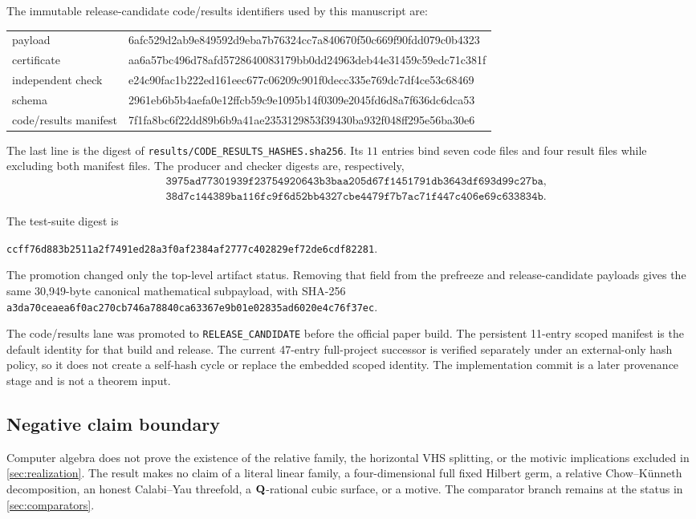 The immutable release-candidate code/results identifiers used by this
manuscript are:
\begin{center}
\scriptsize\ttfamily
\begin{tabular}{@{}ll@{}}
payload & 6afc529d2ab9e849592d9eba7b76324cc7a840670f50c669f90fdd079c0b4323\\
certificate & aa6a57bc496d78afd5728640083179bb0dd24963deb44e31459c59edc71c381f\\
independent check & e24c90fac1b222ed161eec677c06209c901f0decc335e769dc7df4ce53c68469\\
schema & 2961eb6b5b4aefa0e12ffcb59c9e1095b14f0309e2045fd6d8a7f636dc6dca53\\
code/results manifest & 7f1fa8bc6f22dd89b6b9a41ae2353129853f39430ba932f048ff295e56ba30e6\\
\end{tabular}
\end{center}
The last line is the digest of
\texttt{results/CODE\_RESULTS\_HASHES.sha256}.  Its \(11\) entries bind
seven code files and four result files while excluding both manifest files.
The producer and checker digests are, respectively,
\[
\begin{aligned}
&\texttt{3975ad77301939f23754920643b3baa205d67f1451791db3643df693d99c27ba},\\
&\texttt{38d7c144389ba116fc9f6d52bb4327cbe4479f7b7ac71f447c406e69c633834b}.
\end{aligned}
\]

The test-suite digest is
\begin{center}
  \scriptsize
  \texttt{ccff76d883b2511a2f7491ed28a3f0af2384af2777c402829ef72de6cdf82281}.
\end{center}
The promotion changed only the top-level artifact status.  Removing that
field from the prefreeze and release-candidate payloads gives the same
30,949-byte canonical mathematical subpayload, with SHA-256
\texttt{a3da70ceaea6f0ac270cb746a78840ca63367e9b01e02835ad6020e4c76f37ec}.

The code/results lane was promoted to \texttt{RELEASE\_CANDIDATE} before the
official paper build.  The persistent 11-entry scoped manifest is the default
identity for that build and release.  The current 47-entry full-project
successor is verified separately under an external-only hash policy, so it
does not create a self-hash cycle or replace the embedded scoped identity.
The implementation commit is a later provenance stage and is not a theorem
input.

\subsection{Negative claim boundary}

Computer algebra does not prove the existence of the relative family, the
horizontal VHS splitting, or the motivic implications excluded in
\cref{sec:realization}.  The result makes no claim of a literal linear
family, a four-dimensional full fixed Hilbert germ, a relative
Chow--K\"unneth decomposition, an honest Calabi--Yau threefold, a
\(\mathbf Q\)-rational cubic surface, or a motive.  The comparator branch remains
at the status in \cref{sec:comparators}.
